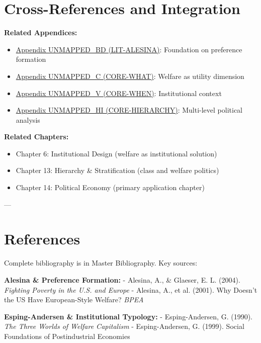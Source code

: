 \section{Cross-References and Integration}
\label{sec:crossref}

\textbf{Related Appendices:}

\begin{itemize}
\item \hyperref[app:lit-alesina]{Appendix UNMAPPED_BD (LIT-ALESINA)}: Foundation on preference formation
\item \hyperref[app:core-what]{Appendix UNMAPPED_C (CORE-WHAT)}: Welfare as utility dimension
\item \hyperref[app:core-when]{Appendix UNMAPPED_V (CORE-WHEN)}: Institutional context
\item \hyperref[app:core-hierarchy]{Appendix UNMAPPED_HI (CORE-HIERARCHY)}: Multi-level political analysis
\end{itemize}

\textbf{Related Chapters:}

\begin{itemize}
\item Chapter 6: Institutional Design (welfare as institutional solution)
\item Chapter 13: Hierarchy \& Stratification (class and welfare politics)
\item Chapter 14: Political Economy (primary application chapter)
\end{itemize}

---

\clearpage


\section{References}
\label{sec:references}

Complete bibliography is in Master Bibliography. Key sources:

\textbf{Alesina \& Preference Formation:}
- Alesina, A., \& Glaeser, E. L. (2004). \emph{Fighting Poverty in the U.S. and Europe}
- Alesina, A., et al. (2001). Why Doesn't the US Have European-Style Welfare? \emph{BPEA}

\textbf{Esping-Andersen \& Institutional Typology:}
- Esping-Andersen, G. (1990). \emph{The Three Worlds of Welfare Capitalism}
- Esping-Andersen, G. (1999). Social Foundations of Postindustrial Economies

